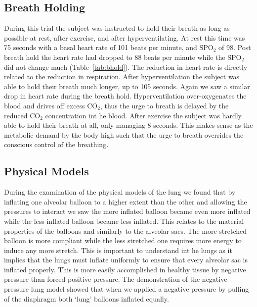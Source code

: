 \documentclass[12pt]{article}
\newcommand{\coo}{CO$_2$}
\newcommand{\spo}{SPO$_2$}
\begin{document}
\subsection{Breath Holding}
During this trial the subject was instructed to hold their breath as long as possible at rest, after exercise, and after hyperventilating. At rest this time was 75 seconds with a basal heart rate of 101 beats per minute, and \spo{} of 98. Post breath hold the heart rate had dropped to 88 beats per minute while the \spo{} did not change much (Table~\ref{tab:bhold}). The reduction in heart rate is directly related to the reduction in respiration. After hyperventilation the subject was able to hold their breath much longer, up to 105 seconds. Again we saw a similar drop in heart rate during the breath hold. Hyperventilation over-oxygenates the blood and drives off excess \coo{}, thus the urge to breath is delayed by the reduced \coo{} concentration int he blood. After exercise the subject was hardly able to hold their breath at all, only managing 8 seconds. This makes sense as the metabolic demand by the body high such that the urge to breath overrides the conscious control of the breathing.

\subsection{Physical Models}
During the examination of the physical models of the lung we found that by inflating one alveolar balloon to a higher extent than the other and allowing the pressures to interact we saw the more inflated balloon became even more inflated while the less inflated balloon became less inflated. This relates to the material properties of the balloons and similarly to the alveolar sacs. The more stretched balloon is more compliant while the less stretched one requires more energy to induce any more stretch. This is important to understand int he lungs as it implies that the lungs must inflate uniformly to ensure that every alveolar sac is inflated properly. This is more easily accomplished in healthy tissue by negative pressure than forced positive pressure. The demonstration of the negative pressure lung model showed that when we applied a negative pressure by pulling of the diaphragm both `lung' balloons inflated equally.
\end{document}
